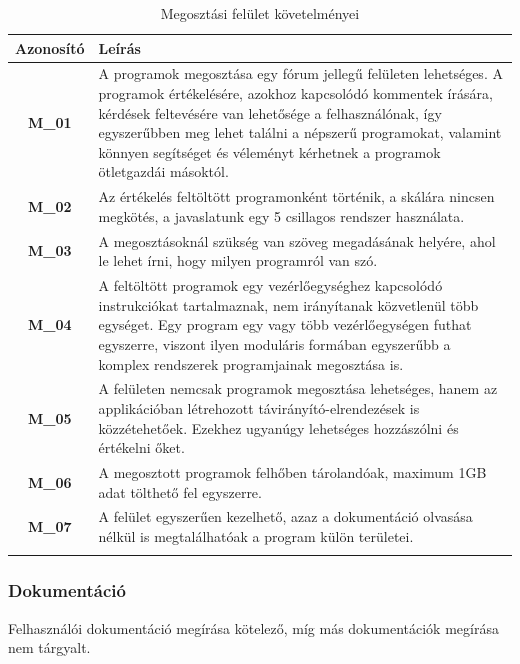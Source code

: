 \documentclass{article}
\begin{document}
\begingroup
\centering
\begin{longtable}{|c|p{14cm}|}
\hline
\textbf{Azonosító} & \textbf{Leírás}        \\ 
\hline
       \textbf{M\_01}  & A programok megosztása egy fórum jellegű felületen lehetséges. A programok értékelésére, azokhoz kapcsolódó kommentek írására, kérdések feltevésére van lehetősége a felhasználónak, így egyszerűbben meg lehet találni a népszerű programokat, valamint könnyen segítséget és véleményt kérhetnek a programok ötletgazdái másoktól. \\\hline
       \textbf{M\_02}  & Az értékelés feltöltött programonként történik, a skálára nincsen megkötés, a javaslatunk egy 5 csillagos rendszer használata. \\\hline
       \textbf{M\_03}  & A megosztásoknál szükség van szöveg megadásának helyére, ahol le lehet írni, hogy milyen programról van szó. \\\hline
       \textbf{M\_04}  & A feltöltött programok egy vezérlőegységhez kapcsolódó instrukciókat tartalmaznak, nem irányítanak közvetlenül több egységet. Egy program egy vagy több vezérlőegységen futhat egyszerre, viszont ilyen moduláris formában egyszerűbb a komplex rendszerek programjainak megosztása is. \\\hline
       \textbf{M\_05}  & A felületen nemcsak programok megosztása lehetséges, hanem az applikációban létrehozott távirányító-elrendezések is közzétehetőek. Ezekhez ugyanúgy lehetséges hozzászólni és értékelni őket. \\\hline
       \textbf{M\_06}  & A megosztott programok felhőben tárolandóak, maximum 1GB adat tölthető fel egyszerre. \\\hline
       \textbf{M\_07}  & A felület egyszerűen kezelhető, azaz a dokumentáció olvasása nélkül is megtalálhatóak a program külön területei. \\\hline
\hline
\caption{Megosztási felület követelményei}
\end{longtable}
\endgroup


\subsubsection{Dokumentáció}
Felhasználói dokumentáció megírása kötelező, míg más dokumentációk megírása nem tárgyalt.
\end{document}
